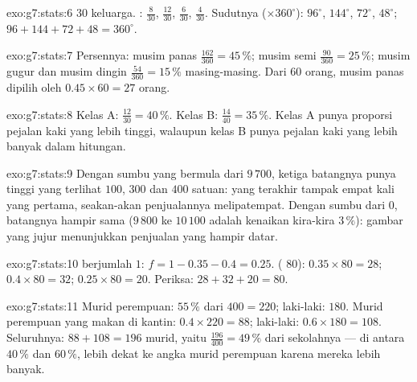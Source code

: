 \begin{solution}{exo:g7:stats:6}
 $30$ keluarga. : $\frac{8}{30}$,
$\frac{12}{30}$, $\frac{6}{30}$, $\frac{4}{30}$. Sudutnya
($\times 360^\circ$): $96^\circ$, $144^\circ$, $72^\circ$, $48^\circ$;
 $96 + 144 + 72 + 48 = 360^\circ$. \checkmark
\end{solution}

\begin{solution}{exo:g7:stats:7}
Persennya: musim panas $\frac{162}{360} = 45\,\%$; musim semi
$\frac{90}{360} = 25\,\%$; musim gugur dan musim dingin
$\frac{54}{360} = 15\,\%$ masing-masing. Dari $60$ orang, musim panas
dipilih oleh $0.45 \times 60 = 27$ orang.
\end{solution}

\begin{solution}{exo:g7:stats:8}
Kelas A: $\frac{12}{30} = 40\,\%$. Kelas B: $\frac{14}{40} = 35\,\%$.
Kelas A punya proporsi pejalan kaki yang lebih tinggi, walaupun kelas
B punya pejalan kaki yang lebih banyak dalam hitungan.
\end{solution}

\begin{solution}{exo:g7:stats:9}
Dengan sumbu yang bermula dari $9\,700$, ketiga batangnya punya tinggi
yang terlihat $100$, $300$ dan $400$ satuan: yang terakhir tampak
empat kali yang pertama, seakan-akan penjualannya melipatempat. Dengan
sumbu dari $0$, batangnya hampir sama ($9\,800$ ke $10\,100$ adalah
kenaikan kira-kira $3\,\%$): gambar yang jujur menunjukkan penjualan
yang hampir datar.
\end{solution}

\begin{solution}{exo:g7:stats:10}
 berjumlah $1$: $f = 1 - 0.35 - 0.4 = 0.25$.
 ( $80$): $0.35 \times 80 = 28$;
$0.4 \times 80 = 32$; $0.25 \times 80 = 20$. Periksa: $28 + 32 + 20 = 80$.
\end{solution}

\begin{solution}{exo:g7:stats:11}
Murid perempuan: $55\,\%$ dari $400 = 220$; laki-laki: $180$. Murid
perempuan yang makan di kantin: $0.4 \times 220 = 88$; laki-laki:
$0.6 \times 180 = 108$. Seluruhnya: $88 + 108 = 196$ murid, yaitu
$\frac{196}{400} = 49\,\%$ dari sekolahnya --- di antara $40\,\%$ dan
$60\,\%$, lebih dekat ke angka murid perempuan karena mereka lebih banyak.
\end{solution}

